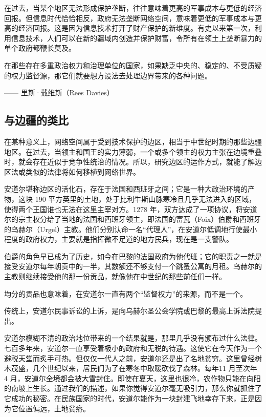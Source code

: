 在过去，当某个地区无法形成保护垄断，往往意味着更高的军事成本与更低的经济回报。但信息时代恰恰相反，政府无法垄断网络空间，意味着更低的军事成本与更高的经济回报。这是因为信息技术打开了财产保护的新维度。有史以来第一次，利用信息技术，人们可以在新的疆域内创造并保护财富，令所有在领土上垄断暴力的单个政府都鞭长莫及。

\begin{tcolorbox}
在那些存在多重政治权力和治理单位的国家，如果缺乏中央的、稳定的、不受质疑的权力监督源，那它们就要想方设法去处理边界带来的各种问题。
\begin{flushright}
—— 里斯·戴维斯（Rees Davies）
\end{flushright}
\end{tcolorbox}

\subsection{与边疆的类比}

在某种意义上，网络空间属于受到技术保护的边区，相当于中世纪时期的那些边疆地区。在过去，当领主和国王的实力薄弱，一个或多个领主的权力主张在边境重叠时，就会存在近似于竞争性统治的情况。所以，研究边区的运作方式，就能了解边区法或类似的法律将如何移植到网络世界。

安道尔堪称边区的活化石，存在于法国和西班牙之间；它是一种大政治环境的产物，这块 190 平方英里的土地，处于比利牛斯山脉寒冷且几乎无法进入的区域，使得两个王国谁也无法在这里主宰对方。1278 年，双方达成了一项协议，将安道尔的宗主权分给了当地的法国和西班牙领主，即法国的富瓦（Foix）伯爵和西班牙的乌赫尔（Urgel）主教。他们分别认命一名“代理人”，在安道尔低调地行使最小程度的政府权力，主要就是指挥微不足道的地方民兵，现在是一支警队。

伯爵的角色早已成为了历史，如今在巴黎的法国政府为他代班；它的职责之一就是接受安道尔每年朝贡中的一半，其数额还不够支付一个跳蚤公寓的月租。乌赫尔的主教则继续接受他的那一份贡品，就像他在中世纪的那些前任们一样。

均分的贡品也意味着，在安道尔一直有两个“监督权力”的来源，而不是一个。

传统上，安道尔民事诉讼的上诉，是向乌赫尔圣公会学院或巴黎的最高上诉法院提出。

安道尔模糊不清的政治地位带来的一个结果就是，那里几乎没有颁布过什么法律。七百多年来，安道尔一直享受着极小的政府和无税的待遇。这使它在今天作为一个避税天堂而炙手可热。但仅仅一代人之前，安道尔还是出了名地贫穷。这里曾经树木茂盛，几个世纪以来，居民们为了在寒冬中取暖砍伐了森林。每年11 月至次年 4 月，安道尔全境都会被大雪封住。即使在夏天，这里也很冷，农作物只能在向阳的南坡上生长。通过我们的描述，如果你觉得安道尔毫无吸引力，那么你就抓住了它成功的秘密。在民族国家的时代，安道尔能作为一块封建飞地幸存下来，正是因为它位置偏远，土地贫瘠。

